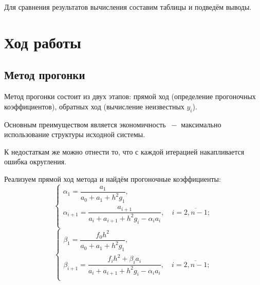 \documentclass[a4paper,12pt]{article}
\begin{document}
{		Для сравнения результатов вычисления составим таблицы и подведём выводы.
		\section{Ход работы}
		\subsection{Метод прогонки}
		\hspace*{1.25cm} Метод прогонки состоит из двух этапов: прямой ход (определение прогоночных коэффициентов), 
		обратных ход (вычисление неизвестных $y_i$).
		
		Основным преимуществом является экономичность $~-$ максимально использование структуры исходной системы.
		
		К недостаткам же можно отнести то, что с каждой итерацией накапливается ошибка округления.
		
		
		Реализуем прямой ход метода и найдём прогоночные коэффициенты:
		\begin{equation}
			\begin{cases}
				\alpha_1 = \dfrac{a_1}{a_0 + a_1 + h^2g_1},\\
				\alpha_{i+1} = \dfrac{a_{i+1}}{a_i + a_{i+1} + h^2g_i - \alpha_ia_i}, \quad i = \overline{2, n - 1};\\
			\end{cases}
		\end{equation}
		\begin{equation}
			\begin{cases}
				\beta_1 = \dfrac{f_0h^2}{a_0 + a_1 + h^2g_1},\\
				\beta_{i+1} = \dfrac{f_ih^2 + \beta_ia_i}{a_i + a_{i+1} + h^2g_i - \alpha_ia_i}, \quad i = \overline{2, n - 1};\\
			\end{cases}
		\end{equation}
		
}
\end{document}
